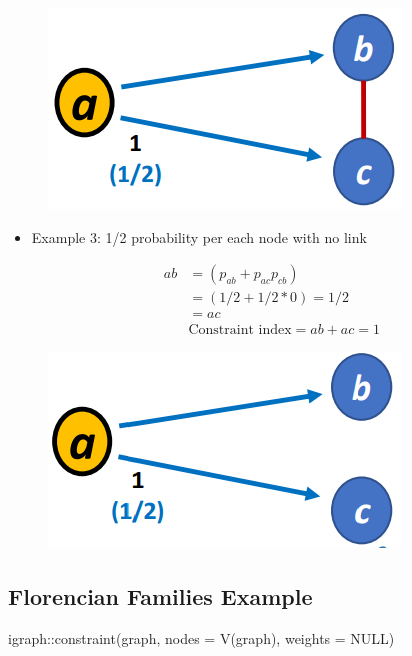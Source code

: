 \documentclass[
  notitlepage,
  onecolumn,
  openany]{book}
\newenvironment{Shaded}{\begin{snugshade}}{\end{snugshade}}
\newcommand{\AttributeTok}[1]{\textcolor[rgb]{0.77,0.63,0.00}{#1}}
\newcommand{\ConstantTok}[1]{\textcolor[rgb]{0.00,0.00,0.00}{#1}}
\newcommand{\FunctionTok}[1]{\textcolor[rgb]{0.00,0.00,0.00}{#1}}
\newcommand{\NormalTok}[1]{#1}
\newcommand{\SpecialCharTok}[1]{\textcolor[rgb]{0.00,0.00,0.00}{#1}}
\begin{document}
\begin{figure}[h!]

{\centering \includegraphics[width=0.4\linewidth]{images/08-Metrics for structural holes/Untitled 2} 

}

\end{figure}

\begin{itemize}
\item
  Example 3: 1/2 probability per each node with no link

  \[
    \begin{aligned}
    ab &= (p_{ab}+p_{ac}p_{cb})
    \\&= (1/2+1/2*0)=1/2\\
    & = ac\\
    &\text{Constraint index} = ab+ac= 1
    \end{aligned}
    \]
\end{itemize}

\begin{figure}[h!]

{\centering \includegraphics[width=0.4\linewidth]{images/08-Metrics for structural holes/Untitled 3} 

}

\end{figure}

\hypertarget{florencian-families-example}{%
\subsection{Florencian Families Example}\label{florencian-families-example}}

\begin{Shaded}
\begin{Highlighting}[]
\NormalTok{igraph}\SpecialCharTok{::}\FunctionTok{constraint}\NormalTok{(graph, }\AttributeTok{nodes =} \FunctionTok{V}\NormalTok{(graph), }\AttributeTok{weights =} \ConstantTok{NULL}\NormalTok{)}
\end{Highlighting}
\end{Shaded}
\end{document}
